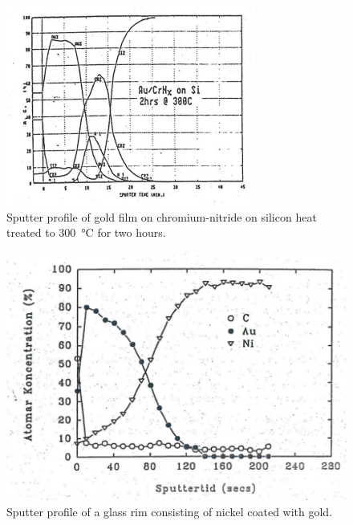 \begin{figure}[h!]
	\begin{center}
	\includegraphics[scale=4.5]{figures/07_12b.png}
	\caption{Sputter profile of gold film on chromium-nitride on silicon heat treated to \SI{300}{\degreeCelsius} for two hours.}
	\label{fig:aucrnsiheatsputter}
	\end{center}
\end{figure}

\begin{figure}[h!]
 	\begin{center}
 	\includegraphics[scale=4]{figures/07_13.png}
 	\caption{Sputter profile of a glass rim consisting of nickel coated with gold.}
 	\label{fig:aunisputter}
 	\end{center}
\end{figure} 

\newpage
